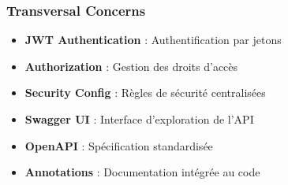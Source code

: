 \documentclass[10pt]{article}
\begin{document}
\vspace{0.8cm}

\subsubsection{Transversal Concerns}

\begin{minipage}{\textwidth}
    \begin{minipage}{0.48\textwidth}
        \begin{tcolorbox}[
            enhanced,
            colback=danger!5,
            colframe=danger,
            arc=5pt,
            title=Sécurité,
            fonttitle=\small\bfseries\sffamily\color{white},
            coltitle=white,
            colbacktitle=danger
        ]
            \begin{itemize}[leftmargin=12pt, itemsep=2pt, font=\small\sffamily]
                \item \textbf{JWT Authentication} : Authentification par jetons
                \item \textbf{Authorization} : Gestion des droits d'accès
                \item \textbf{Security Config} : Règles de sécurité centralisées
            \end{itemize}
        \end{tcolorbox}
    \end{minipage}
    \hfill
    \begin{minipage}{0.48\textwidth}
        \begin{tcolorbox}[
            enhanced,
            colback=info!5,
            colframe=info,
            arc=5pt,
            title=Documentation API,
            fonttitle=\small\bfseries\sffamily\color{white},
            coltitle=white,
            colbacktitle=info
        ]
            \begin{itemize}[leftmargin=12pt, itemsep=2pt, font=\small\sffamily]
                \item \textbf{Swagger UI} : Interface d'exploration de l'API
                \item \textbf{OpenAPI} : Spécification standardisée
                \item \textbf{Annotations} : Documentation intégrée au code
            \end{itemize}
        \end{tcolorbox}
    \end{minipage}
\end{minipage}
\end{document}
